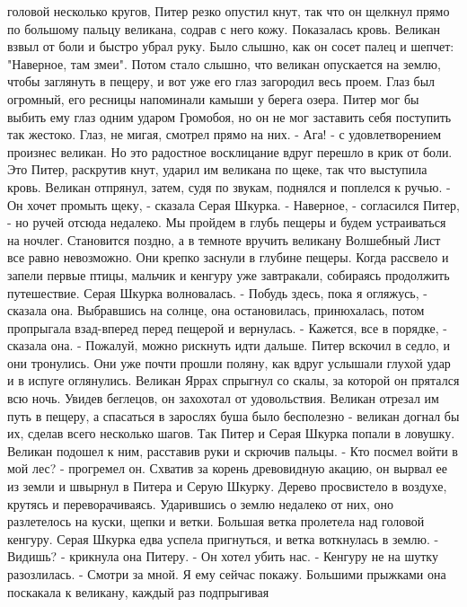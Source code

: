 головой несколько кругов, Питер резко опустил кнут, так что он щелкнул 
прямо по большому пальцу великана, содрав с него кожу. Показалась 
кровь.
    Великан взвыл от боли и быстро убрал руку. Было слышно, как он 
сосет палец и шепчет: "Наверное, там змеи".
    Потом стало слышно, что великан опускается на землю, чтобы 
заглянуть в пещеру, и вот уже его глаз загородил весь проем. Глаз был 
огромный, его ресницы напоминали камыши у берега озера. Питер мог бы 
выбить ему глаз одним ударом Громобоя, но он не мог заставить себя 
поступить так жестоко. Глаз, не мигая, смотрел прямо на них.
    - Ага! - с удовлетворением произнес великан.
    Но это радостное восклицание вдруг перешло в крик от боли. Это 
Питер, раскрутив кнут, ударил им великана по щеке, так что выступила 
кровь. Великан отпрянул, затем, судя по звукам, поднялся и поплелся к 
ручью.
    - Он хочет промыть щеку, - сказала Серая Шкурка.
    - Наверное, - согласился Питер, - но ручей отсюда недалеко. Мы 
пройдем в глубь пещеры и будем устраиваться на ночлег. Становится 
поздно, а в темноте вручить великану Волшебный Лист все равно 
невозможно.
    Они крепко заснули в глубине пещеры. Когда рассвело и запели 
первые птицы, мальчик и кенгуру уже завтракали, собираясь продолжить 
путешествие.
    Серая Шкурка волновалась.
    - Побудь здесь, пока я огляжусь, - сказала она. Выбравшись на 
солнце, она остановилась, принюхалась, потом пропрыгала взад-вперед 
перед пещерой и вернулась.
    - Кажется, все в порядке, - сказала она. - Пожалуй, можно рискнуть 
идти дальше.
    Питер вскочил в седло, и они тронулись. Они уже почти прошли 
поляну, как вдруг услышали глухой удар и в испуге оглянулись. Великан 
Яррах спрыгнул со скалы, за которой он прятался всю ночь. Увидев 
беглецов, он захохотал от удовольствия. Великан отрезал им путь в 
пещеру, а спасаться в зарослях буша было бесполезно - великан догнал 
бы их, сделав всего несколько шагов. Так Питер и Серая Шкурка попали в 
ловушку. Великан подошел к ним, расставив руки и скрючив пальцы.
    - Кто посмел войти в мой лес? - прогремел он. Схватив за корень 
древовидную акацию, он вырвал ее из земли и швырнул в Питера и Серую 
Шкурку. Дерево просвистело в воздухе, крутясь и переворачиваясь. 
Ударившись о землю недалеко от них, оно разлетелось на куски, щепки и 
ветки. Большая ветка пролетела над головой кенгуру. Серая Шкурка едва 
успела пригнуться, и ветка воткнулась в землю.
    - Видишь? - крикнула она Питеру. - Он хотел убить нас. - Кенгуру 
не на шутку разозлилась. - Смотри за мной. Я ему сейчас покажу.
    Большими прыжками она поскакала к великану, каждый раз подпрыгивая 
